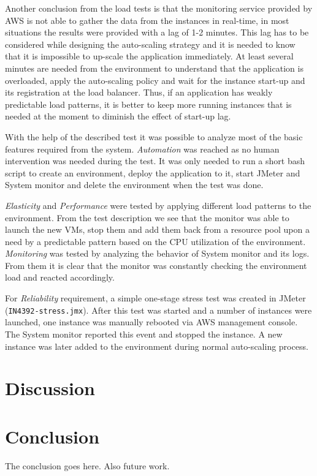 \documentclass[conference]{IEEEtran}
\begin{document}
Another conclusion from the load tests is that the monitoring service provided by AWS is not able to gather the data from the instances in real-time, in most situations the results were provided with a lag of 1-2 minutes. This lag has to be considered while designing the auto-scaling strategy and it is needed to know that it is impossible to up-scale the application immediately. At least several minutes are needed from the environment to understand that the application is overloaded, apply the auto-scaling policy and wait for the instance start-up and its registration at the load balancer. Thus, if an application has weakly predictable load patterns, it is better to keep more running instances that is needed at the moment to diminish the effect of start-up lag.

With the help of the described test it was possible to analyze most of the basic features required from the system. \emph{Automation} was reached as no human intervention was needed during the test. It was only needed to run a short bash script to create an environment, deploy the application to it, start JMeter and System monitor and delete the environment when the test was done.

\emph{Elasticity} and \emph{Performance} were tested by applying different load patterns to the environment. From the test description we see that the monitor was able to launch the new VMs, stop them and add them back from a resource pool upon a need by a predictable pattern based on the CPU utilization of the environment. \emph{Monitoring} was tested by analyzing the behavior of System monitor and its logs. From them it is clear that the monitor was constantly checking the environment load and reacted accordingly.

For \emph{Reliability} requirement, a simple one-stage stress test was created in JMeter (\texttt{IN4392-stress.jmx}). After this test was started and a number of instances were launched, one instance was manually rebooted via AWS management console. The System monitor reported this event and stopped the instance. A new instance was later added to the environment during normal auto-scaling process.

\section{Discussion}

\section{Conclusion}
The conclusion goes here. Also future work.
\end{document}
